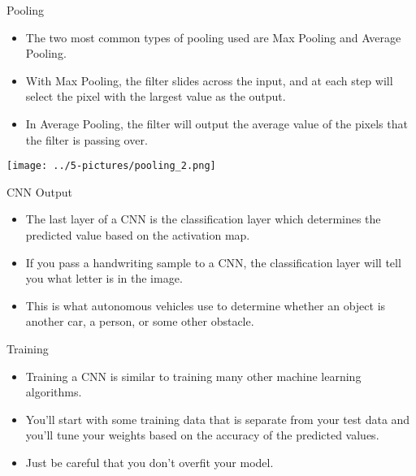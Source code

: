 \documentclass[11pt]{beamer}
\begin{document}
\begin{frame}{Pooling}
\footnotesize{
	\begin{itemize}
		\item The two most common types of pooling used are Max Pooling and Average Pooling. 
		\item With Max Pooling, the filter slides across the input, and at each step will select the pixel with the largest value as the output. 
		\item In Average Pooling, the filter will output the average value of the pixels that the filter is passing over.
	\end{itemize}}
	\begin{center}
	\texttt{[image: ../5-pictures/pooling\_2.png]}
	\end{center}
\end{frame}
\begin{frame}{CNN Output}
	\begin{itemize}
		\item The last layer of a CNN is the classification layer which determines the predicted value based on the activation map. 
		\item If you pass a handwriting sample to a CNN, the classification layer will tell you what letter is in the image. 
		\item This is what autonomous vehicles use to determine whether an object is another car, a person, or some other obstacle.
	\end{itemize}
\end{frame}
\begin{frame}{Training}
	\begin{itemize}
		\item Training a CNN is similar to training many other machine learning algorithms. 
		\item You'll start with some training data that is separate from your test data and you'll tune your weights based on the accuracy of the predicted values. 
		\item Just be careful that you don't overfit your model.
	\end{itemize}
\end{frame}
%
\end{document}
